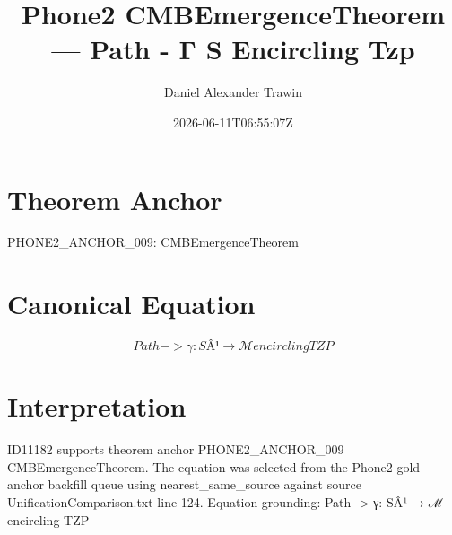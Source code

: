 \documentclass[11pt]{article}
\title{Phone2 CMBEmergenceTheorem — Path - Γ S Encircling Tzp}
\author{Daniel Alexander Trawin}
\date{2026-06-11T06:55:07Z}
\begin{document}
\maketitle
\section*{Theorem Anchor}
PHONE2_ANCHOR_009: CMBEmergenceTheorem
\section*{Canonical Equation}
\[
Path -> γ: SÂ¹ → ℳ encircling TZP
\]
\section*{Interpretation}
ID11182 supports theorem anchor PHONE2_ANCHOR_009 CMBEmergenceTheorem. The equation was selected from the Phone2 gold-anchor backfill queue using nearest_same_source against source UnificationComparison.txt line 124. Equation grounding: Path -> γ: SÂ¹ → ℳ encircling TZP
\end{document}
